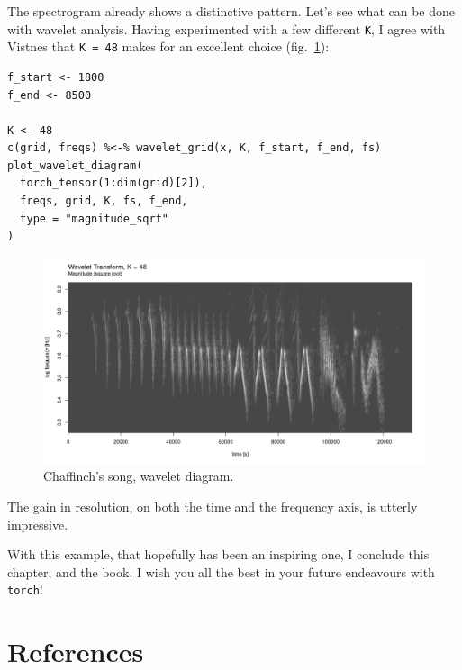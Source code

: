 \documentclass[
  letterpaper,
]{krantz}
\begin{document}
The spectrogram already shows a distinctive pattern. Let's see what can
be done with wavelet analysis. Having experimented with a few different
\texttt{K}, I agree with Vistnes that \texttt{K\ =\ 48} makes for an
excellent choice (fig.~\ref{fig-wav-chaffinch-waveletdiag}):

\begin{verbatim}
f_start <- 1800
f_end <- 8500

K <- 48
c(grid, freqs) %<-% wavelet_grid(x, K, f_start, f_end, fs)
plot_wavelet_diagram(
  torch_tensor(1:dim(grid)[2]),
  freqs, grid, K, fs, f_end,
  type = "magnitude_sqrt"
)
\end{verbatim}

\begin{figure}[H]

{\centering \includegraphics{images/wav-chaffinch-waveletdiag.png}

}

\caption{\label{fig-wav-chaffinch-waveletdiag}Chaffinch's song, wavelet
diagram.}

\end{figure}

The gain in resolution, on both the time and the frequency axis, is
utterly impressive.

With this example, that hopefully has been an inspiring one, I conclude
this chapter, and the book. I wish you all the best in your future
endeavours with \texttt{torch}!


\hypertarget{references}{%
\chapter*{References}\label{references}}

\end{document}
